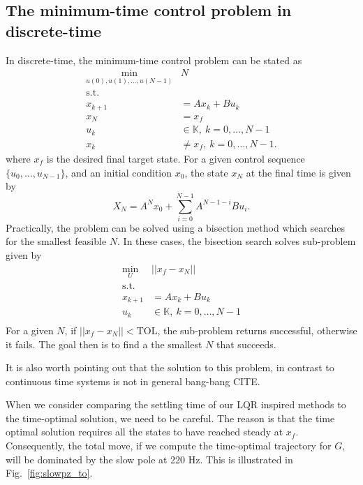 \documentclass[journal,twocolumn,twoside]{IEEEtran/IEEEtran}
\begin{document}
\subsection{The minimum-time control problem in discrete-time}\label{sec:mintime}
\label{sec:org6d1d6b6}
In discrete-time, the minimum-time control problem can be stated as \cite{chen_minimumtime_cca}
\begin{align}
\min_{u(0), u(1),\dots,u(N-1)} & N\\
\text{s.t.}&\\
x_{k+1} & = Ax_{k} + Bu_{k}\\
x_{N} & = x_{f}\\
u_{k}&\in \mathds{K},~k=0,\dots,N-1\\
x_{k} &\neq x_{f},~k=0,\dots,N-1.
\end{align}
where $x_f$ is the desired final target state. 
For a given control sequence $\{u_0,\dots, u_{N-1}\}$, and an initial condition $x_0$, the state $x_N$ at the final time is given by
\begin{equation}
X_N = A^Nx_0 + \sum_{i=0}^{N-1}A^{N-1-i}Bu_i.
\end{equation}
Practically, the problem can be solved using a bisection method which searches for the smallest feasible \(N\). In these cases, the bisection search solves sub-problem given by
\begin{align}
\min_{U}& || x_{f} - x_{N}||\\
\text{s.t.} &\\
x_{k+1} & = Ax_{k} + Bu_{k}\\
u_{k}&\in \mathds{K},~k=0,\dots,N-1\\
\end{align}
For a given \(N\), if \(||x_{f} - x_{N}|| < \text{TOL}\), the sub-problem returns successful, otherwise it fails. The goal then is to find a the smallest \(N\) that succeeds. 

It is also worth pointing out that the solution to this problem, in contrast to continuous time systems is not in general bang-bang CITE.

When we consider comparing the settling time of our LQR inspired methods to the time-optimal solution, we need to be careful.
The reason is that the time optimal solution requires all the states to have reached steady at $x_f$. Consequently, the total move, if we compute the time-optimal trajectory for $G$, will be dominated by the slow pole at 220 Hz. This is illustrated in Fig.~\ref{fig:slowpz_to}.
\end{document}
